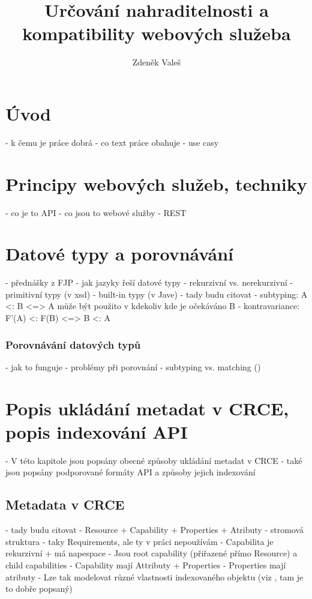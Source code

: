 \documentclass[czech,DP]{thesiskiv}
\author{Zdeněk Valeš}
\title{Určování nahraditelnosti a\\kompatibility webových služeba}
\begin{document}
%
\maketitle
\tableofcontents

\chapter{Úvod}

- k čemu je práce dobrá
- co text práce obahuje
- use casy

\chapter{Principy webových služeb, techniky}

 - co je to API
 - co jsou to webové služby
 - REST

\chapter{Datové typy a porovnávání}

- přednášky z FJP
- jak jazyky řeší datové typy
	- rekurzivní vs. nerekurzivní
- primitivní typy (v xsd)
- built-in typy (v Jave)
- tady budu citovat \cite{abadi1995subytping}
	- subtyping: A <: B <=> A může být použito v kdekoliv kde je očekáváno B
	- kontravariance: F'(A) <: F(B) <=> B <: A

\subsection{Porovnávání datových typů}

 - jak to funguje
 - problémy při porovnání
 - subtyping vs. matching (\cite{abadi1995subytping})


\chapter{Popis ukládání metadat v CRCE, popis indexování API}

 - V této kapitole jsou popsány obecné způsoby ukládání metadat v CRCE
 - také jsou popsány podporované formáty API a způsoby jejich indexování

\section{Metadata v CRCE}

 - tady budu citovat \cite{brada2015repository}
 - Resource + Capability + Properties + Atributy
 	- stromová struktura
 - taky Requirements, ale ty v práci nepoužívám
 - Capabilita je rekurzivní + má napespace
 - Jsou root capability (přiřazené přímo Resource) a child capabilities
 - Capability mají Attributy + Properties
 - Properties mají atributy
 - Lze tak modelovat různé vlastnosti indexovaného objektu (viz \cite{brada2015repository}, tam je to dobře popsaný)
 
\end{document}
